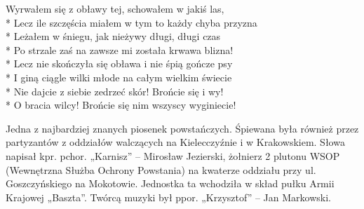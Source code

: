 \begin{lyrics}[longestline={Bo z trzema na raz walczy psami i trzech ran na raz krwawi.}]
\chorusref

Wyrwałem się z obławy tej, schowałem w jakiś las,\\*
Lecz ile szczęścia miałem w tym to każdy chyba przyzna\\*
Leżałem w śniegu, jak nieżywy długi, długi czas\\*
Po strzale zaś na zawsze mi została krwawa blizna!\\*
Lecz nie skończyła się obława i nie śpią gończe psy\\*
I giną ciągle wilki młode na całym wielkim świecie\\*
Nie dajcie z siebie zedrzeć skór! Brońcie się i wy!\\*
O bracia wilcy! Brońcie się nim wszyscy wyginiecie!

\chorusref
\end{lyrics}



\begin{info}Jedna z najbardziej znanych piosenek powstańczych. Śpiewana była również przez partyzantów z oddziałów walczących na Kielecczyźnie i w Krakowskiem. Słowa napisał kpr. pchor. „Karnisz” – Mirosław Jezierski, żołnierz 2 plutonu WSOP (Wewnętrzna Służba Ochrony Powstania) na kwaterze oddziału przy ul. Goszczyńskiego na Mokotowie. Jednostka ta wchodziła w skład pułku Armii Krajowej „Baszta”. Twórcą muzyki był ppor. „Krzysztof” – Jan Markowski.\end{info}

